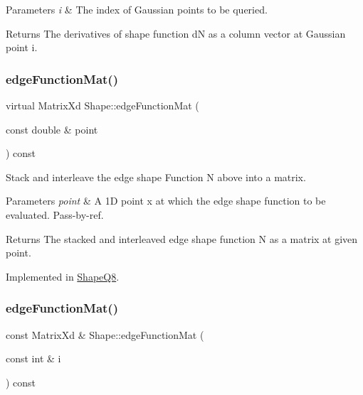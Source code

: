 \begin{DoxyParams}{Parameters}
{\em i} & The index of Gaussian points to be queried. \\
\hline
\end{DoxyParams}
\begin{DoxyReturn}{Returns}
The derivatives of shape function dN as a column vector at Gaussian point i. 
\end{DoxyReturn}
\mbox{\label{class_shape_ac9854f15377ea07c97be16049e3058d5}} 
\subsubsection{\texorpdfstring{edge\+Function\+Mat()}{edgeFunctionMat()}\hspace{0.1cm}{\footnotesize\ttfamily [1/2]}}
{\footnotesize\ttfamily virtual Matrix\+Xd Shape\+::edge\+Function\+Mat (\begin{DoxyParamCaption}\item[{const double \&}]{point }\end{DoxyParamCaption}) const\hspace{0.3cm}{\ttfamily [pure virtual]}}



Stack and interleave the edge shape Function N above into a matrix. 


\begin{DoxyParams}{Parameters}
{\em point} & A 1D point x at which the edge shape function to be evaluated. Pass-\/by-\/ref. \\
\hline
\end{DoxyParams}
\begin{DoxyReturn}{Returns}
The stacked and interleaved edge shape function N as a matrix at given point. 
\end{DoxyReturn}


Implemented in \mbox{\hyperlink{class_shape_q8_a0c52ac2dbeb9297c11e03c664d4750b7}{Shape\+Q8}}.

\mbox{\label{class_shape_a5d6e400458f3381b3adeeac34839e401}} 
\subsubsection{\texorpdfstring{edge\+Function\+Mat()}{edgeFunctionMat()}\hspace{0.1cm}{\footnotesize\ttfamily [2/2]}}
{\footnotesize\ttfamily const Matrix\+Xd \& Shape\+::edge\+Function\+Mat (\begin{DoxyParamCaption}\item[{const int \&}]{i }\end{DoxyParamCaption}) const}



